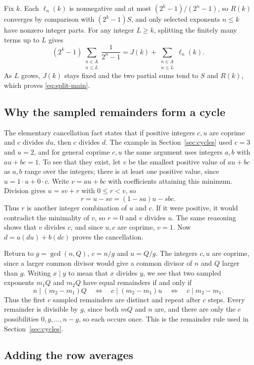 \documentclass[10pt]{article}
\theoremstyle{plain}
\theoremstyle{definition}
\theoremstyle{remark}
\newcommand{\lft}{\ell}
\begin{document}
Fix $k$. Each $\lft_n(k)$ is nonnegative and at most
$(2^k-1)/(2^n-1)$, so $R(k)$ converges by comparison with $(2^k-1)S$,
and only selected exponents $n\le k$ have nonzero integer parts. For
any integer $L\ge k$, splitting the finitely many terms up to $L$ gives
\[
 (2^k-1)\sum_{\substack{n\in A\\n\le L}}\frac1{2^n-1}
 =J(k)+\sum_{\substack{n\in A\\n\le L}}\lft_n(k).
\]
As $L$ grows, $J(k)$ stays fixed and the two partial sums tend to $S$
and $R(k)$, which proves \eqref{eq:split-main}.

\subsection{Why the sampled remainders form a cycle}\label{app:cycle}

The elementary cancellation fact states that if positive integers
$c,u$ are coprime and $c$ divides $du$, then $c$ divides $d$. The
example in Section~\ref{sec:cycles} used $c=3$ and $u=2$, and for
general coprime $c,u$ the same argument uses integers $a,b$ with
$au+bc=1$. To see that they exist, let $v$ be the smallest positive
value of $au+bc$ as $a,b$ range over the integers; there is at least
one positive value, since $u=1\cdot u+0\cdot c$. Write $v=au+bc$ with
coefficients attaining this minimum. Division gives $u=sv+r$ with
$0\le r<v$, so
\[
 r=u-sv=(1-sa)u-sbc.
\]
Thus $r$ is another integer combination of $u$ and $c$. If it were positive, it
would contradict the minimality of $v$, so $r=0$ and $v$ divides $u$.
The same reasoning shows that $v$ divides $c$, and since $u,c$ are
coprime, $v=1$. Now $d=a(du)+b(dc)$ proves the cancellation.

Return to $g=\gcd(n,Q)$, $c=n/g$ and $u=Q/g$. The integers $c,u$ are
coprime, since a larger common divisor would give a common divisor of
$n$ and $Q$ larger than $g$. Writing $x\mid y$ to mean that $x$ divides
$y$, we see that two sampled exponents $m_1Q$ and $m_2Q$ have equal
remainders if and only if
\[
 n\mid(m_2-m_1)Q
 \quad\Longleftrightarrow\quad
 c\mid(m_2-m_1)u
 \quad\Longleftrightarrow\quad
 c\mid m_2-m_1.
\]
Thus the first $c$ sampled remainders are distinct and repeat after
$c$ steps. Every remainder is divisible by $g$, since both $mQ$ and $n$
are, and there are only the $c$ possibilities $0,g,\dots,n-g$, so each
occurs once. This is the remainder rule used in
Section~\ref{sec:cycles}.

\subsection{Adding the row averages}\label{app:proof}
\end{document}
